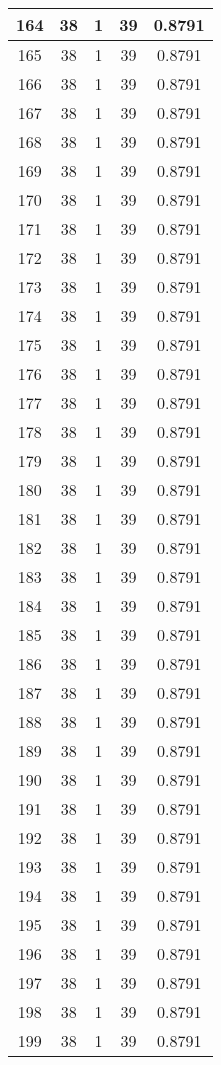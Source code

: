 \documentclass[letterpaper, 12pt]{article}
\begin{document}
\begin{longtable}{|c|c|c|c|c|}
\hline
164 & 38 & 1 & 39 & 0.8791 \\
\hline
165 & 38 & 1 & 39 & 0.8791 \\
\hline
166 & 38 & 1 & 39 & 0.8791 \\
\hline
167 & 38 & 1 & 39 & 0.8791 \\
\hline
168 & 38 & 1 & 39 & 0.8791 \\
\hline
169 & 38 & 1 & 39 & 0.8791 \\
\hline
170 & 38 & 1 & 39 & 0.8791 \\
\hline
171 & 38 & 1 & 39 & 0.8791 \\
\hline
172 & 38 & 1 & 39 & 0.8791 \\
\hline
173 & 38 & 1 & 39 & 0.8791 \\
\hline
174 & 38 & 1 & 39 & 0.8791 \\
\hline
175 & 38 & 1 & 39 & 0.8791 \\
\hline
176 & 38 & 1 & 39 & 0.8791 \\
\hline
177 & 38 & 1 & 39 & 0.8791 \\
\hline
178 & 38 & 1 & 39 & 0.8791 \\
\hline
179 & 38 & 1 & 39 & 0.8791 \\
\hline
180 & 38 & 1 & 39 & 0.8791 \\
\hline
181 & 38 & 1 & 39 & 0.8791 \\
\hline
182 & 38 & 1 & 39 & 0.8791 \\
\hline
183 & 38 & 1 & 39 & 0.8791 \\
\hline
184 & 38 & 1 & 39 & 0.8791 \\
\hline
185 & 38 & 1 & 39 & 0.8791 \\
\hline
186 & 38 & 1 & 39 & 0.8791 \\
\hline
187 & 38 & 1 & 39 & 0.8791 \\
\hline
188 & 38 & 1 & 39 & 0.8791 \\
\hline
189 & 38 & 1 & 39 & 0.8791 \\
\hline
190 & 38 & 1 & 39 & 0.8791 \\
\hline
191 & 38 & 1 & 39 & 0.8791 \\
\hline
192 & 38 & 1 & 39 & 0.8791 \\
\hline
193 & 38 & 1 & 39 & 0.8791 \\
\hline
194 & 38 & 1 & 39 & 0.8791 \\
\hline
195 & 38 & 1 & 39 & 0.8791 \\
\hline
196 & 38 & 1 & 39 & 0.8791 \\
\hline
197 & 38 & 1 & 39 & 0.8791 \\
\hline
198 & 38 & 1 & 39 & 0.8791 \\
\hline
199 & 38 & 1 & 39 & 0.8791 \\
\hline
\end{longtable}
\end{document}
